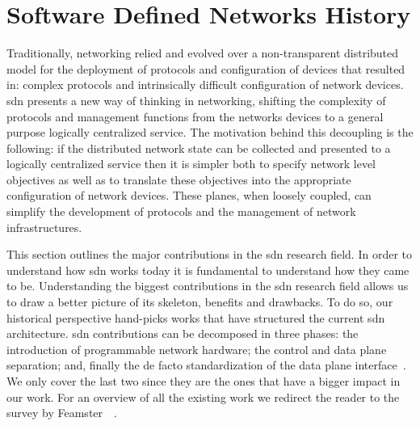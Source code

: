 \glsresetall

\section{Software Defined Networks History}
Traditionally, networking  relied and evolved over a non-transparent distributed model for the deployment of protocols and configuration of devices that resulted in: complex protocols and intrinsically difficult configuration of network devices. 
\gls{sdn} presents a new way of thinking in networking, shifting the complexity of protocols and management functions from  the  networks devices to a general purpose logically centralized service. 
The motivation behind this decoupling is the following: if the distributed network state can be collected and presented to a logically centralized service then it is simpler  both to specify network level objectives as well as to translate these objectives into the appropriate configuration of network devices. 
These planes, when loosely coupled, can simplify the development of protocols and the management of network infrastructures. 

This section outlines the major contributions in the \gls{sdn} research field.   
In order to understand how \gls{sdn} works today it is fundamental to understand how they came to be. 
Understanding the biggest contributions in the \gls{sdn} research field allows us to draw a better picture of its skeleton, benefits and drawbacks. 
To do so, our  historical perspective hand-picks works that have structured the current \gls{sdn} architecture. 
\gls{sdn} contributions can be decomposed  in three phases: the introduction of programmable network hardware; the control and data plane separation; and, finally the de facto standardization of the data plane interface~\cite{feamster2013road}. 
We only cover the last two since they are the ones that have a bigger impact in our work. 
For an overview of all the existing work we redirect the reader to the survey by Feamster~\etal~\cite{feamster2013road}. 




